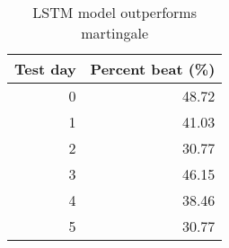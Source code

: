 \begin{table}[H]
\centering
\caption{LSTM model outperforms martingale}
\label{tab:percent_days_outperform_total}
\begin{tabular}{rr}
\toprule
Test day & Percent beat (\%) \\
\midrule
0 & 48.72 \\
1 & 41.03 \\
2 & 30.77 \\
3 & 46.15 \\
4 & 38.46 \\
5 & 30.77 \\
\bottomrule
\end{tabular}
\end{table}
